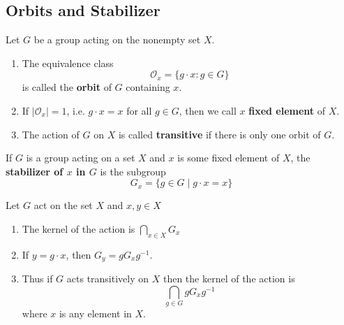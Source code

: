 \subsection{Orbits and Stabilizer} %
\begin{definition}
    Let $G$ be a group acting on the nonempty set $X$.
    \begin{enumerate}
        \item
              The equivalence class
              \begin{equation*}
                  \mathcal{O}_x
                  =
                  \{g \cdot x : g \in G\}
              \end{equation*}
              is called the \textbf{orbit} of $G$ containing $x$.

        \item
              If $\left|\mathcal{O}_x\right|=1$, i.e. $g\cdot x =x$ for all $g\in G$, then we call $x$ \textbf{fixed element} of $X$.

        \item
              The action of $G$ on $X$ is called \textbf{transitive} if there is only one orbit of $G$.
    \end{enumerate}
\end{definition}

\begin{definition}
    If $G$ is a group acting on a set $X$ and $x$ is some fixed element of $X$, the \textbf{stabilizer of $x$ in $G$} is the subgroup
    \begin{equation*}
        G_x=\{g \in G \mid g \cdot x=x\}
    \end{equation*}
\end{definition}

\begin{proposition}
    Let $G$ act on the set $X$ and $x,y \in X$
    \begin{enumerate}
        \item
              The kernel of the action is
              $\bigcap_{x\in X} G_x$
        \item
              If $ y= g \cdot x$, then $G_y=g G_x g^{-1}$.

        \item
              Thus if $G$ acts transitively on $X$ then the kernel of the action is
              \begin{equation*}
                  \bigcap_{g \in G} g G_x g^{-1}
              \end{equation*}
              where $x$ is any element in $X$.
    \end{enumerate}
\end{proposition}



